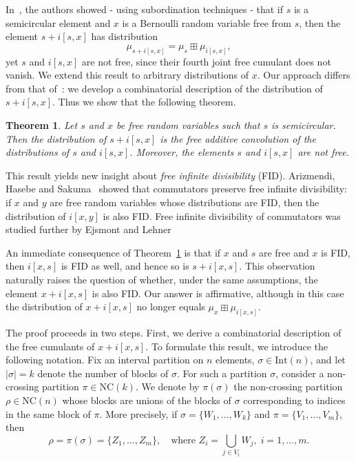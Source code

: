 \documentclass{amsart}
\newtheorem{thm}[claim]{Theorem}
\begin{document}
In~\cite{LehnerSzpojankowski}, the authors showed - using subordination techniques - that if \( s \) is a semicircular element and \( x \) is a Bernoulli random variable free from \( s \), then the element \( s + i[s,x] \) has distribution
\[
\mu_{s + i[s,x]} = \mu_s \boxplus \mu_{i[s,x]},
\]
yet \( s \) and \( i[s,x] \) are not free, since their fourth joint free cumulant does not vanish.  
We extend this result to arbitrary distributions of \( x \).  
Our approach differs from that of~\cite{LehnerSzpojankowski}: we develop a combinatorial description of the distribution of \( s + i[s,x] \).  
Thus we show that the following theorem.

\begin{thm}
	\label{thm:main1}
	Let \( s \) and \( x \) be free random variables such that \( s \) is semicircular. Then the distribution of \( s + i[s, x] \) is the free additive convolution of the distributions of \( s \) and \( i[s, x] \). Moreover, the elements \( s \) and \( i[s, x] \) are not free.
\end{thm}

This result yields new insight about \emph{free infinite divisibility} (FID).  
Arizmendi, Hasebe and Sakuma~\cite{AHS} showed that commutators preserve free infinite divisibility: if \( x \) and \( y \) are free random variables whose distributions are FID, then the distribution of \( i[x,y] \) is also FID. Free infinite divisibility of commutators was studied further by Ejsmont and Lehner \cite{LehnerEjsmont}

An immediate consequence of Theorem~\ref{thm:main1} is that if \(x\) and \(s\) are free and \( x \) is FID, then \( i[x,s] \) is FID as well, and hence so is \( s + i[x,s] \).  
This observation naturally raises the question of whether, under the same assumptions, the element \( x + i[x,s] \) is also FID. Our answer is affirmative, although in this case the distribution of \( x + i[x,s] \) no longer equals \( \mu_x \boxplus \mu_{i[x,s]} \).

The proof proceeds in two steps.  
First, we derive a combinatorial description of the free cumulants of \( x + i[x,s] \).  
To formulate this result, we introduce the following notation.  
Fix an interval partition on \( n \) elements, \( \sigma \in \mathrm{Int}(n) \), and let \( |\sigma| = k \) denote the number of blocks of \( \sigma \).  
For such a partition \( \sigma \), consider a non-crossing partition \( \pi \in \mathrm{NC}(k) \).  
We denote by \( \pi(\sigma) \) the non-crossing partition \( \rho \in \mathrm{NC}(n) \) whose blocks are unions of the blocks of \( \sigma \) corresponding to indices in the same block of \( \pi \).  
More precisely, if \( \sigma = \{W_1, \ldots, W_k\} \) and \( \pi = \{V_1, \ldots, V_m\} \), then
\[
\rho = \pi(\sigma) = \{Z_1, \ldots, Z_m\}, \quad \text{where } Z_i = \bigcup_{j \in V_i} W_j, \; i = 1,\ldots,m.
\]
\end{document}
